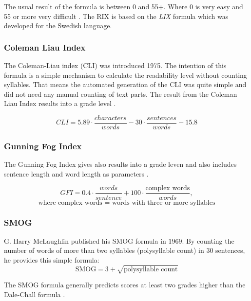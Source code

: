\documentclass[runningheads,a4paper]{llncs}
\begin{document}
 The usual result of the formula is between 0 and 55+. Where 0 is very easy and 55 or more very difficult \cite{webmining2007}.
 The RIX is based on the \emph{LIX} formula which was developed for the Swedish language.
 
 \subsubsection{Coleman Liau Index}
 
 The Coleman-Liau index (CLI) was introduced 1975. The intention of this formula is a simple mechanism to calculate the readability level without counting syllables. That means the automated generation of the CLI was quite simple and did not need any manual counting of text parts. The result from the Coleman Liau Index results into a grade level \cite{webmining2007}.

 \begin{equation} CLI = 5.89 \cdot \frac{characters}{words} - 30 \cdot \frac{sentences}{words} - 15.8 \end{equation}


\subsubsection{Gunning Fog Index}
 The Gunning Fog Index gives also results into a grade leven and also includes sentence length and word length as parameters \cite{webmining2007}. 
 
 \begin{equation} GFI = 0.4 \cdot \frac{words}{sentence} + 100 \cdot \frac{\text{complex words}}{words},  \end{equation}
 \begin{equation*}
 \text{where complex words = words with three or more syllables}
 \end{equation*}

\subsubsection{SMOG}

G. Harry McLaughlin published his SMOG formula in 1969. By counting the number of words of more than two syllables (polysyllable count) in 30 sentences, he provides this simple formula:
\begin{equation}
\text{SMOG} = 3 + \sqrt{\text{polysyllable count}}
\end{equation}
 
The SMOG formula generally predicts scores at least two grades higher than the Dale-Chall formula \cite{Dubay2004}.
\end{document}
